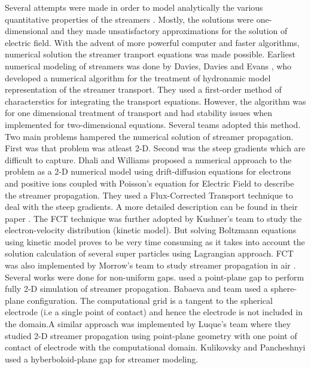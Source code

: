 Several attempts were made in order to model analytically the various quantitative properties of the streamers \cite{Wright & London 1964, }. Mostly, the solutions were one-dimensional and they made unsatisfactory approximations for the solution of electric field. With the advent of more powerful computer and faster algorithms, numerical solution the streamer tranport equations was made possible. Earliest numerical modeling of streamers was done by Davies, Davies and Evans \cite{Davies et al 1971}, who developed a numerical algorithm for the treatment of hydronamic model representation of the streamer transport. They used a first-order method of characterstics for integrating the transport equations. However, the algorithm was for one dimensional treatment of transport and had stability issues when implemented for two-dimensional equations. Several teams \cite{Kline, 1974; Abbas & Bayle, 1980; Yoshida & Tagashira, 1976} adopted this method. Two main problems hampered the numerical solution of streamer propagation. First was that problem was atleast 2-D. Second was the steep gradients which are difficult to capture. Dhali and Williams proposed a numerical approach to the problem as a 2-D numerical model using drift-diffusion equations for electrons and positive ions coupled with Poisson's equation for Electric Field to describe the streamer propagation. They used a Flux-Corrected Transport technique to deal with the steep gradients. A more detailed description can be found in their paper \cite{Dhalli 1987}. The FCT technique was further adopted by Kushner's team \cite{Kushner et al 1989} to study the electron-velocity distribution (kinetic model). But solving Boltzmann equations using kinetic model proves to be very time consuming as it takes into account the solution calculation of several super particles using Lagrangian approach. FCT was also implemented by Morrow's team to study streamer propagation in air \cite{Morrow et al, 1997}. Several works were done for non-uniform gaps. \cite{Vitello et al, 1994} used a point-plane gap to perform fully 2-D simulation of streamer propagation. Babaeva and team \cite{Babaeva 1997} used a sphere-plane configuration. The computational grid is a tangent to the spherical electrode (i.e a single point of contact) and hence the electrode is not included in the domain.A similar approach was implemented by Luque's team \cite{Luque et al 2008} where they studied 2-D streamer propagation using point-plane geometry with one point of contact of electrode with the computational domain. Kulikovsky \cite{Kulikovsky 1994} and Pancheshnyi \cite{Pancheshnyi S 2005} used a hyberboloid-plane gap for streamer modeling.

